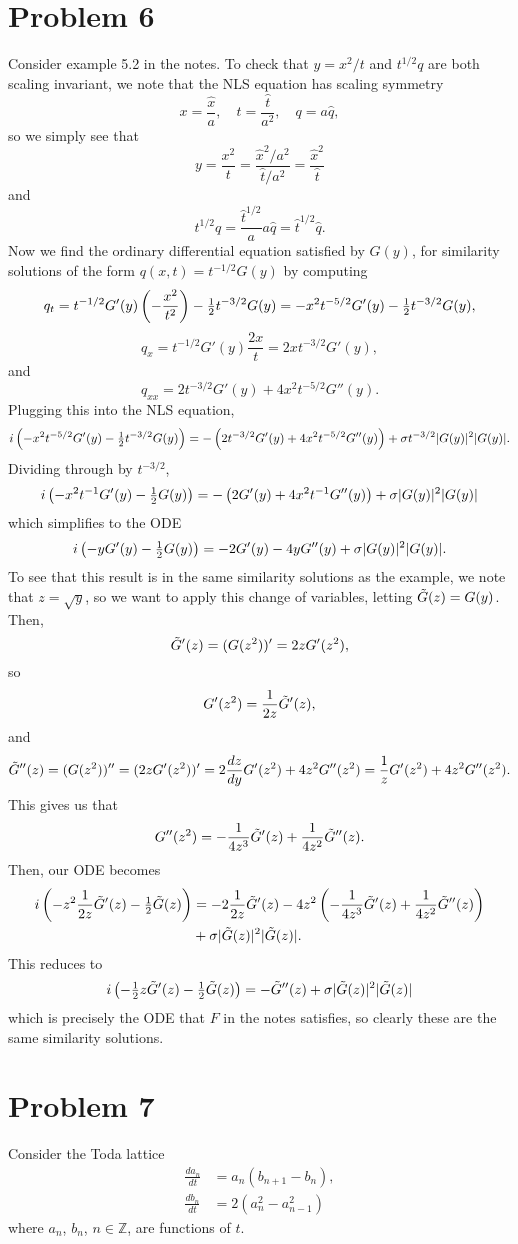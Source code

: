 \documentclass{article}
\begin{document}
\section{Problem 6}
Consider example 5.2 in the notes. To check that $y=x^2/t$ and $t^{1/2} q$ are both scaling invariant, we note that the NLS equation has scaling symmetry
\[
x=\frac{\hat{x}}{a},\quad t=\frac{\hat{t}}{a^2}, \quad q=a\hat{q},
\]
so we simply see that 
\[
y=\frac{x^2}{t}=\frac{\hat{x}^2/a^2}{\hat{t}/a^2}=\frac{\hat{x}^2}{\hat{t}}
\]
and 
\[
t^{1/2}q=\frac{\hat{t}^{1/2}}{a}a\hat{q}=\hat{t}^{1/2}\hat{q}.
\]
Now we find the ordinary differential equation satisfied by $G(y)$, for similarity solutions of the form $q(x,t)=t^{-1/2}G(y)$ by computing
\[
q_t=t^{-1/2}G'(y)\left(-\frac{x^2}{t^2}\right)-\mbox{$\frac{1}{2}$} t^{-3/2}G(y)=-x^2t^{-5/2}G'(y)-\mbox{$\frac{1}{2}$} t^{-3/2}G(y),
\]
\[
q_x=t^{-1/2}G'(y)\frac{2x}{t}=2xt^{-3/2}G'(y),
\]
and
\[
q_{xx}=2t^{-3/2}G'(y)+4x^2t^{-5/2}G''(y).
\]
Plugging this into the NLS equation,
\[
i\left(-x^2t^{-5/2}G'(y)-\mbox{$\frac{1}{2}$} t^{-3/2}G(y)\right)=-\left(2t^{-3/2}G'(y)+4x^2t^{-5/2}G''(y)\right)+\sigma t^{-3/2}|G(y)|^2|G(y)|.
\]
Dividing through by $t^{-3/2}$,
\[
i\left(-x^2t^{-1}G'(y)-\mbox{$\frac{1}{2}$} G(y)\right)=-\left(2G'(y)+4x^2t^{-1}G''(y)\right)+\sigma|G(y)|^2|G(y)|
\]
which simplifies to the ODE
\[
i\left(-yG'(y)-\mbox{$\frac{1}{2}$} G(y)\right)=-2G'(y)-4yG''(y)+\sigma|G(y)|^2|G(y)|.
\]
To see that this result is in the same similarity solutions as the example, we note that $z=\sqrt{y}$, so we want to apply this change of variables, letting $\Tilde{G}(z)=G(y)$. Then, $$\Tilde{G}'(z)=(G(z^2))'=2zG'(z^2),$$ so $$G'(z^2)=\frac{1}{2z}\Tilde{G}'(z),$$ and 
\[
\Tilde G''(z)=(G(z^2))''=(2zG'(z^2))'=2\frac{dz}{dy} G'(z^2)+4z^2{G}''(z^2)=\frac{1}{z}G'(z^2)+4z^2{G}''(z^2).
\]
This gives us that
\[ G''(z^2)=-\frac{1}{4z^3}\Tilde{G}'(z)+\frac{1}{4z^2}\Tilde{G}''(z).
\]
Then, our ODE becomes
\begin{align*}
i\left(-z^2\frac{1}{2z}\Tilde{G}'(z)-\mbox{$\frac{1}{2}$} \tilde{G}(z)\right)&=-2\frac{1}{2z}\Tilde{G}'(z)-4z^2\left(-\frac{1}{4z^3}\Tilde{G}'(z)+\frac{1}{4z^2}\Tilde{G}''(z)\right)\\&+\sigma|\Tilde G(z)|^2|\Tilde G(z)|.
\end{align*}
This reduces to
\[
i\left(-\mbox{$\frac{1}{2}$} z\Tilde{G}'(z)-\mbox{$\frac{1}{2}$} \tilde{G}(z)\right)=-\Tilde{G}''(z)+\sigma|\Tilde G(z)|^2|\Tilde G(z)|
\]
which is precisely the ODE that $F$ in the notes satisfies, so clearly these are the same similarity solutions.

\section{Problem 7}
Consider the Toda lattice 
\begin{align*}
	\frac{da_n}{dt}&=a_n(b_{n+1}-b_n),\\
	\frac{db_n}{dt}&=2(a_n^2-a_{n-1}^2)
\end{align*}
where $a_n$, $b_n$, $n\in \mathbb{Z}$, are functions of $t$. 
\end{document}
